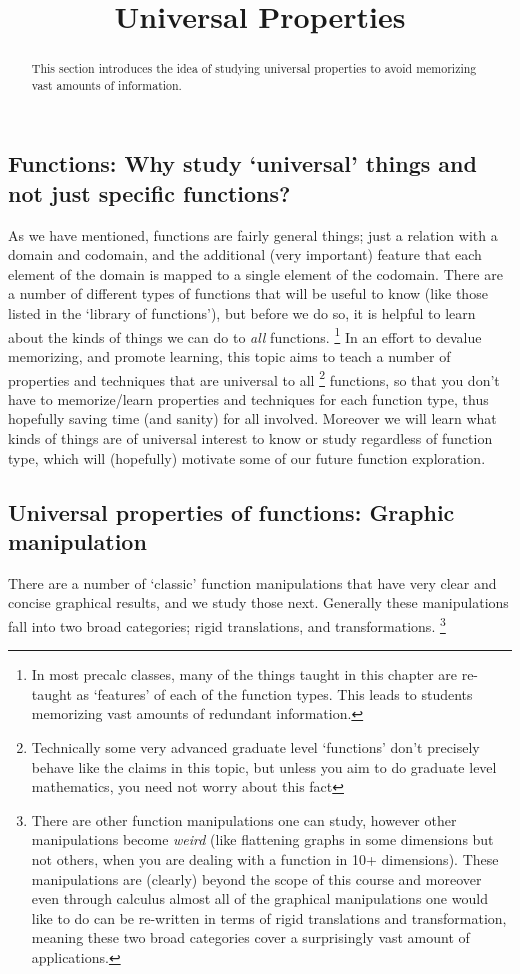 \documentclass{ximeraXloud}
\title{Universal Properties}
\begin{document}
\begin{abstract}
    This section introduces the idea of studying universal properties to avoid memorizing vast amounts of information.
\end{abstract}
\maketitle

\subsection*{Functions: Why study `universal' things and not just specific functions?}

    As we have mentioned, functions are fairly general things; just a relation with a domain and codomain, and the additional (very important) feature that each element of the domain is mapped to a single element of the codomain. There are a number of different types of functions that will be useful to know (like those listed in the `library of functions'), but before we do so, it is helpful to learn about the kinds of things we can do to \textit{all} functions.%
    \footnote{%
        In most precalc classes, many of the things taught in this chapter are re-taught as `features' of each of the function types. This leads to students memorizing vast amounts of redundant information.%
        }
    In an effort to devalue memorizing, and promote learning, this topic aims to teach a number of properties and techniques that are universal to all%
    \footnote{%
        Technically some very advanced graduate level `functions' don't precisely behave like the claims in this topic, but unless you aim to do graduate level mathematics, you need not worry about this fact%
        }
    functions, so that you don't have to memorize/learn properties and techniques for each function type, thus hopefully saving time (and sanity) for all involved. Moreover we will learn what kinds of things are of universal interest to know or study regardless of function type, which will (hopefully) motivate some of our future function exploration.

\subsection*{Universal properties of functions: Graphic manipulation}

    There are a number of `classic' function manipulations that have very clear and concise graphical results, and we study those next. Generally these manipulations fall into two broad categories; rigid translations, and transformations.%
    \footnote{%
        There are other function manipulations one can study, however other manipulations become \textit{weird} (like flattening graphs in some dimensions but not others, when you are dealing with a function in 10+ dimensions). These manipulations are (clearly) beyond the scope of this course and moreover even through calculus almost all of the graphical manipulations one would like to do can be re-written in terms of rigid translations and transformation, meaning these two broad categories cover a surprisingly vast amount of applications.%
        }
    
\end{document}
